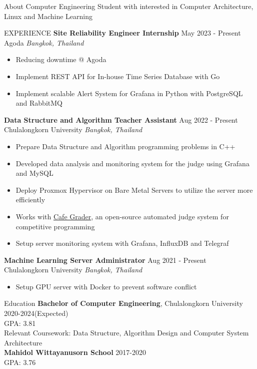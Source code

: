 \documentclass{resume} %
\begin{document}
\begin{rSection}{About}
    {Computer Engineering Student with interested in Computer Architecture, Linux and Machine Learning}
\end{rSection}

\begin{rSection}{EXPERIENCE}
    \textbf{Site Reliability Engineer Internship} \hfill May 2023 - Present\\
    Agoda \hfill \textit{Bangkok, Thailand}
    \begin{itemize}
        \item Reducing downtime @ Agoda
        \item Implement REST API for In-house Time Series Database with Go
        \item Implement scalable Alert System for Grafana in Python with PostgreSQL and RabbitMQ
    \end{itemize}
    \textbf{Data Structure and Algorithm Teacher Assistant} \hfill Aug 2022 - Present\\
    Chulalongkorn University \hfill \textit{Bangkok, Thailand}
    \begin{itemize}
        \itemsep -3pt {}
        \item Prepare Data Structure and Algorithm programming problems in C++
        \item Developed data analysis and monitoring system for the judge using Grafana and MySQL
        \item Deploy Proxmox Hypervisor on Bare Metal Servers to utilize the server more efficiently
        \item Works with \href{https://github.com/nattee/cafe-grader-web}{Cafe Grader}, an open-source automated  judge system for competitive programming
        \item Setup server monitoring system with Grafana, InfluxDB and Telegraf
    \end{itemize}
    \textbf{Machine Learning Server Administrator} \hfill Aug 2021 - Present\\
    Chulalongkorn University \hfill \textit{Bangkok, Thailand}
    \begin{itemize}
        \itemsep -3pt {}
        \item Setup GPU server with Docker to prevent software conflict
    \end{itemize}
\end{rSection}

\begin{rSection}{Education}
    {\bf Bachelor of Computer Engineering}, Chulalongkorn University  \hfill {2020-2024(Expected)}\\
    GPA: 3.81\\
    Relevant Coursework: Data Structure, Algorithm Design and Computer System Architecture\\
    {\bf Mahidol Wittayanusorn School} \hfill {2017-2020}\\
    GPA: 3.76
\end{rSection}
\end{document}
